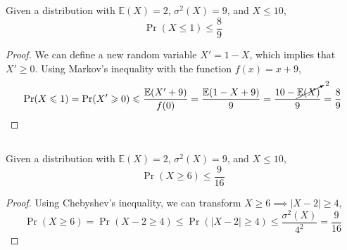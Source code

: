 \documentclass{article}
\newcommand{\E}{\mathbb{E}}
\begin{document}
\subsection{}

\begin{theorem}
    Given a distribution with \(\E(X) = 2\), \(\sigma^2(X) = 9\), and \(X \leqslant 10\),
    \begin{equation}
        \Pr(X \leqslant 1) \leqslant \frac{8}{9}
    \end{equation}
\end{theorem}
\begin{proof}
    We can define a new random variable \(X' = 1 - X\), which implies that \(X' \geqslant 0\).
    Using Markov's inequality with the function \(f(x) = x + 9\),
    \begin{equation}
        \Pr(X \leqslant 1) = \Pr(X' \geqslant 0) \leqslant \frac{\E(X' + 9)}{f(0)} = \frac{\E(1 - X + 9)}{9} = \frac{10 - \cancelto{2}{\E(X)}}{9} = \frac{8}{9}
    \end{equation}
\end{proof}

\subsection{}

\begin{theorem}
    Given a distribution with \(\E(X) = 2\), \(\sigma^2(X) = 9\), and \(X \leqslant 10\),
    \begin{equation}
        \Pr(X \geqslant 6) \leqslant \frac{9}{16}
    \end{equation}
\end{theorem}
\begin{proof}
    Using Chebyshev's inequality, we can transform \(X \geqslant 6 \implies |X - 2| \geqslant 4\),
    \begin{equation}
        \Pr(X \geqslant 6) = \Pr(X - 2 \geqslant 4) \leqslant \Pr(|X - 2| \geqslant 4) \leqslant \frac{\sigma^2(X)}{4^2} = \frac{9}{16}
    \end{equation}
\end{proof}
\end{document}
